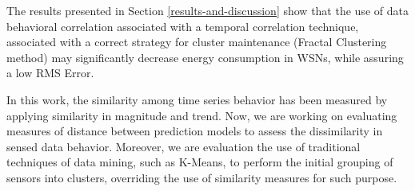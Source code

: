 \documentclass{acm_proc_article-sp}
\begin{document}
The results presented in Section \ref{results-and-discussion} show that the use
of data behavioral correlation associated with a temporal correlation technique,
associated with a correct strategy for cluster maintenance (Fractal Clustering
method) may significantly decrease energy consumption in WSNs, while assuring a
low RMS Error.

In this work, the similarity among time series behavior has been measured by
applying similarity in magnitude and trend. Now, we are working on evaluating
measures of distance between prediction models to assess the dissimilarity in
sensed data behavior. Moreover, we are evaluation the use of traditional
techniques of data mining, such as K-Means, to perform the initial grouping of
sensors into clusters, overriding the use of similarity measures for such
purpose.






%   
  
\end{document}

